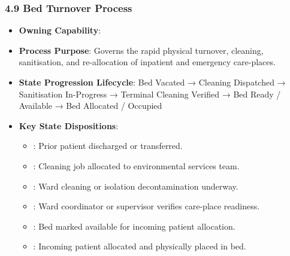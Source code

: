 \par\smallskip
{}\label{rad:processes:203}
\subsubsection*{4.9 Bed Turnover Process}
\label{rad:processes:204}

\begin{itemize}

\item
\textbf{Owning Capability}: \texttt{}



\item
\textbf{Process Purpose}: Governs the rapid physical turnover, cleaning, sanitisation, and re-allocation of inpatient and emergency care-places.



\item
\textbf{State Progression Lifecycle}: Bed Vacated → Cleaning Dispatched → Sanitisation In-Progress → Terminal Cleaning Verified → Bed Ready /\allowbreak{} Available → Bed Allocated /\allowbreak{} Occupied



\item
\textbf{Key State Dispositions}:


\begin{itemize}

\item
\texttt{}: Prior patient discharged or transferred.



\item
\texttt{}: Cleaning job allocated to environmental services team.



\item
\texttt{}: Ward cleaning or isolation decontamination underway.



\item
\texttt{}: Ward coordinator or supervisor verifies care-place readiness.



\item
\texttt{}: Bed marked available for incoming patient allocation.



\item
\texttt{}: Incoming patient allocated and physically placed in bed.



\end{itemize}


\end{itemize}
\label{rad:processes:216}

